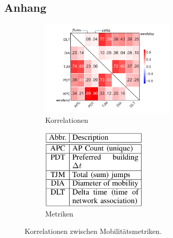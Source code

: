 \documentclass[12pt, a4paper]{article}
\begin{document}
\begin{appendix}
\section{Anhang}

\begin{figure}[H]
    \centering
    \begin{subfigure}[b]{0.45\textwidth}
        \includegraphics[width=0.7\textwidth]{img/mobility_correlations.png}
        \caption{Korrelationen \cite{Alipour2018}}
    \end{subfigure}
    \hfill
    \begin{subfigure}[b]{0.45\textwidth}
        \includegraphics[width=0.55\textwidth]{img/mobility_metrics.png}
        \caption{Metriken \cite{Alipour2018}}
    \end{subfigure}
    \caption{Korrelationen zwischen Mobilitätsmetriken.}
    \label{fig:mobility_correlations}
\end{figure}


\end{appendix}
\end{document}
